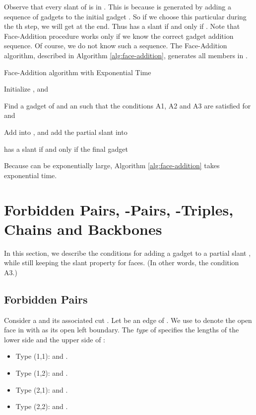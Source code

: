 \documentclass[11pt]{article}
\begin{document}
Observe that every slant   of  is in . This is because
 is generated by adding a sequence of gadgets 
to the initial gadget .
So if we choose this particular  during the th step, we will get 
at the end. Thus  has a slant  if and only if .
Note that Face-Addition procedure works only if we know the correct
gadget addition sequence. Of course, we do not know such a sequence.
The Face-Addition algorithm, described in Algorithm
\ref{alg:face-addition}, generates all members in .

\begin{algorithm}[htb]
\caption{Face-Addition algorithm with Exponential Time}
\label{alg:face-addition}

Initialize ,
and \;

{
Find a gadget  of  and an  such that
the conditions A1, A2 and A3 are satisfied for  and \;

Add  into ,
and add the partial slant   into \;
}

 has a slant  if and only if the final gadget \;
\end{algorithm}

Because  can be exponentially large, Algorithm
\ref{alg:face-addition} takes exponential time.

\section{Forbidden Pairs, -Pairs, -Triples, Chains and Backbones}
\label{sec:concept}

In this section, we describe the conditions for adding a gadget to a
partial slant  , while still keeping the slant
 property for  faces. (In other words, the condition A3.)

\subsection{Forbidden Pairs}\label{sec:forbidden}

Consider a  and its associated cut .
Let  be an edge of . We use  to denote the
open  face in  with  as its open left boundary.
The {\em type} of  specifies the lengths of the
lower side  and the upper side  of :

\begin{itemize}
\item Type (1,1):  and .
\item Type (1,2):  and .
\item Type (2,1):  and .
\item Type (2,2):  and .
\end{itemize}
\end{document}
